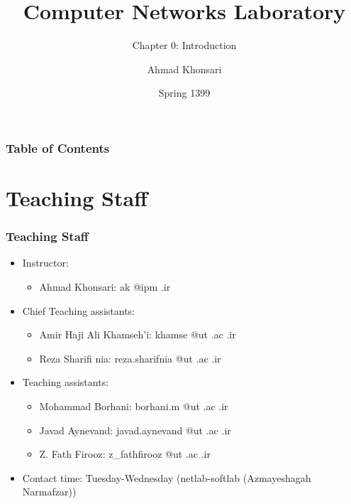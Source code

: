\documentclass[aspectratio=169,15pt]{beamer}
\title{Computer Networks Laboratory}
\subtitle{Chapter 0: Introduction}
\author{Ahmad Khonsari}
\institute[ECE @ UT]{
    Electrical and Computer Engineering Department\\
    Tehran University \newline
    \url{http://ece.ut.ac.ir/portal/}
}
\date{Spring 1399}
\begin{document}
\frame{\titlepage}


\begin{frame}
    \frametitle{Table of Contents}
    \tableofcontents
\end{frame}

\section{Teaching Staff}
\begin{frame}
\frametitle{Teaching Staff}
\begin{itemize}
    \item Instructor:
    \begin{itemize}
        \item Ahmad Khonsari: \alert{ak @ipm .ir}
    \end{itemize}
    \item Chief Teaching assistants:
    \begin{itemize}
        \item Amir Haji Ali Khamseh’i: \alert{khamse @ut .ac .ir}
        \item Reza Sharifi nia: \alert{reza.sharifnia @ut .ac .ir}
    \end{itemize}
    \item Teaching assistants:
    \begin{itemize}
        \item Mohammad Borhani: \alert{borhani.m @ut .ac .ir}
        \item Javad Aynevand: \alert{javad.aynevand @ut .ac .ir}
        \item Z. Fath Firooz: \alert{z\_fathfirooz @ut .ac .ir}
    \end{itemize}
    \item Contact time: Tuesday-Wednesday (netlab-softlab (Azmayeshagah Narmafzar))
\end{itemize}

\end{frame}
\end{document}
